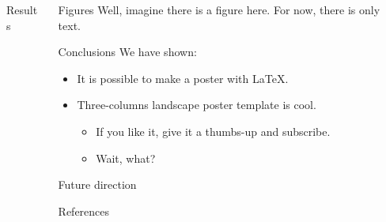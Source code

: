 \documentclass[final]{beamer}
\begin{document}
\begin{frame}
\begin{columns}[t]
\begin{column}{.33\textwidth}
\begin{block}{Results}
  \justify
  \lipsum[5-6]
\end{block}
\end{column}

\begin{column}{.33\textwidth}

\begin{block}{Figures}
  \justify
  Well, imagine there is a figure here. For now, there is only text. \\
  \lipsum[7-8]
\end{block}

\begin{block}{Conclusions}
  We have shown:
  \begin{itemize}
    \item It is possible to make a poster with \LaTeX.
    \item Three-columns landscape poster template is cool.
    \begin{itemize}
      \item If you like it, give it a thumbs-up and subscribe.
      \item Wait, what?
    \end{itemize}
  \end{itemize}
\end{block}

\begin{block}{Future direction}
  \justify
  \lipsum[9]
\end{block}

\begin{block}{References}
  \justify
    \small %
    \nocite{*} %
    
        
\end{block}
\end{column}

\end{columns}
\end{frame}
\end{document}
